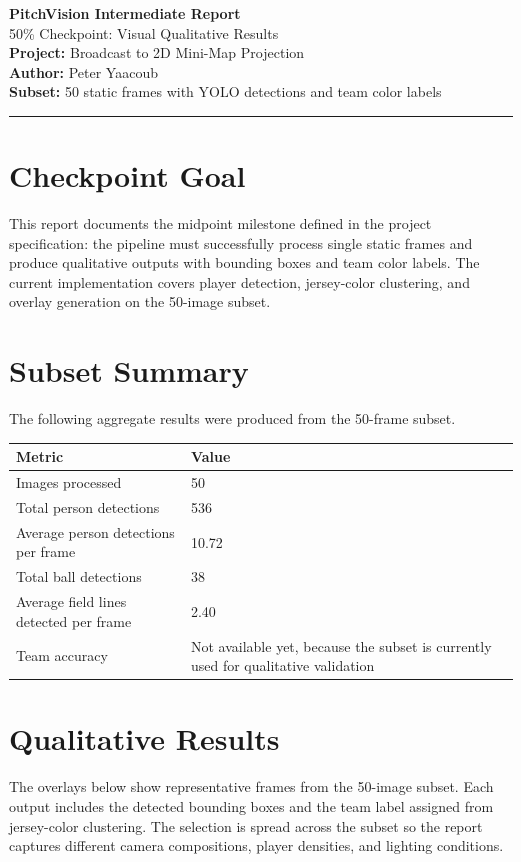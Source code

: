 \documentclass[11pt]{article}
\begin{document}
\begin{center}
    {\Large \textbf{PitchVision Intermediate Report}} \\
    {\large 50\% Checkpoint: Visual Qualitative Results} \\
    \vspace{0.15cm}
    \textbf{Project:} Broadcast to 2D Mini-Map Projection \\
    \textbf{Author:} Peter Yaacoub \\
    \textbf{Subset:} 50 static frames with YOLO detections and team color labels
\end{center}

\vspace{0.2cm}
\hrule

\section{Checkpoint Goal}
This report documents the midpoint milestone defined in the project specification: the pipeline must successfully process single static frames and produce qualitative outputs with bounding boxes and team color labels. The current implementation covers player detection, jersey-color clustering, and overlay generation on the 50-image subset.

\section{Subset Summary}
The following aggregate results were produced from the 50-frame subset.

\begin{tabularx}{\textwidth}{@{} >{\raggedright\arraybackslash}p{} X @{} }
\toprule
\textbf{Metric} & \textbf{Value} \\
\midrule
Images processed & 50 \\
Total person detections & 536 \\
Average person detections per frame & 10.72 \\
Total ball detections & 38 \\
Average field lines detected per frame & 2.40 \\
Team accuracy & Not available yet, because the subset is currently used for qualitative validation \\
\bottomrule
\end{tabularx}

\section{Qualitative Results}
The overlays below show representative frames from the 50-image subset. Each output includes the detected bounding boxes and the team label assigned from jersey-color clustering. The selection is spread across the subset so the report captures different camera compositions, player densities, and lighting conditions.
\end{document}
